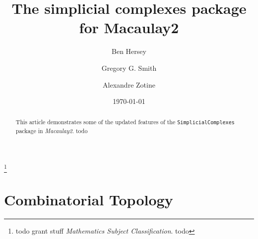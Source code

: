 \documentclass[12pt,leqno]{amsart}
\theoremstyle{definition}
\begin{document}
\title[Simplicial Complexes]{The simplicial complexes package for Macaulay2}
\author[B.~Hersey]{Ben Hersey}
\address{Ben Hersey: Department of Mathematics and Statistics, Queen's University, Kingston, Ontario, K7L 3N6;
  {\normalfont \texttt{b.hersey@queensu.ca}}}

\author[G.G.~Smith]{Gregory G.{} Smith}
\address{Gregory G.{} Smith: Department of Mathematics and Statistics, Queen's
  University, Kingston, Ontario, K7L 3N6, Canada; {\normalfont
    \texttt{ggsmith@mast.queensu.ca}}}

\author[A.~Zotine]{Alexandre Zotine}
\address{Alexandre Zotine: Department of Mathematics and Statistics, Queen's University, Kingston, Ontario, K7L 3N6;
  {\normalfont \texttt{18az45@queensu.ca}}}

\thanks{todo grant stuff \emph{Mathematics Subject Classification}. todo}
\date{\today}

\begin{abstract}
  This article demonstrates some of the updated features of the \texttt{SimplicialComplexes} package in \emph{Macaulay2}. todo
\end{abstract}

\maketitle


\addtocounter{section}{1}
\addtocounter{lemma}{-1}

\noindent

\section{Combinatorial Topology}
\end{document}
